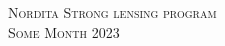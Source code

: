 \documentclass[10pt]{article} %
\begin{document}
\pagestyle{empty} %

\setlength{\parindent}{0pt} %



\begin{center}
	\textsc{\LARGE Nordita Strong lensing program}\\ %
	\textsc{\large Some Month 2023} %
\end{center}

\end{document}
